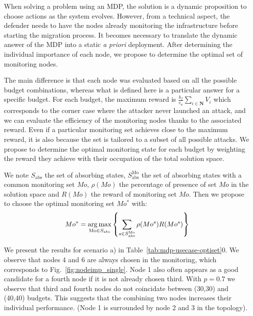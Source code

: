 When solving a problem using an MDP, the solution is a dynamic proposition to choose actions as the system evolves.
However, from a technical aspect, the defender needs to have the nodes already monitoring the infrastructure before starting the migration process.
It becomes necessary to translate the dynamic answer of the MDP into a static \textit{a priori} deployment.
After determining the individual importance of each node, we propose to determine the optimal set of monitoring nodes.

The main difference is that each node was evaluated based on all the possible budget combinations, whereas what is defined here is a particular answer for a specific budget.
For each budget, the maximum reward is $\frac{b_f}{c_a} \sum\limits_{i \in \textbf{N}}V_i $ which corresponds to the corner case where the attacker never launched an attack, and we can evaluate the efficiency of the   monitoring nodes thanks to the associated reward.
Even if a particular monitoring set achieves close to the maximum reward, it is also because the set is tailored to a subset of all possible attacks.
We propose to determine the optimal monitoring state for each budget by weighting the reward they achieve with their occupation of the total solution space.

We note $S_{\text{abs}}$ the set of absorbing states, $S^{\text{Mo}}_{\text{abs}}$ the set of absorbing states with a common  monitoring set $Mo$, $\rho(Mo)$ the percentage of presence of set $Mo$ in the solution space and $R(Mo)$ the reward of monitoring set $Mo$.
Then we propose to choose the optimal monitoring set $Mo^*$ with:
\begin{equation}
    Mo^* = \operatorname*{arg\,max}\limits_{\text{Mo} \in S_{\text{abs}}} \left \{\sum\limits_{s \in S^{\text{Mo}}_{\text{abs}}}\rho(Mo^s)R(Mo^s) \right \}
\end{equation}

We present the results for scenario a) in Table~\ref{tab:mdp-usecase-optiset}0.
We observe that nodes 4 and 6 are always chosen in the monitoring, which corresponds to Fig.~\ref{fig:nodeimp_single}.
Node 1 also often appears as a good candidate for a fourth node if it is not already chosen third.
With $p=0.7$ we observe that third and fourth nodes do not coincidate between (30,30) and (40,40) budgets.
This suggests that the combining two nodes increases their individual performance.
(Node 1 is surrounded by node 2 and 3 in the topology).

